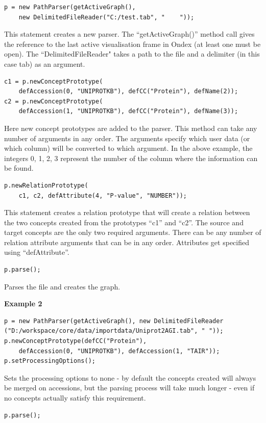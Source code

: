 \begin{verbatim}
p = new PathParser(getActiveGraph(), 
	new DelimitedFileReader("C:/test.tab", "	"));
\end{verbatim}
This statement creates a new parser. The ``getActiveGraph()'' method call gives the reference to the last active visualisation frame in Ondex (at least one must be open). 
The ``DelimitedFileReader" takes a path to the file and a delimiter (in this case tab) as an argument.
\begin{verbatim}
c1 = p.newConceptPrototype(
	defAccession(0, "UNIPROTKB"), defCC("Protein"), defName(2));
c2 = p.newConceptPrototype(
	defAccession(1, "UNIPROTKB"), defCC("Protein"), defName(3));
\end{verbatim}
Here new concept prototypes are added to the parser. This method can take any number of arguments in any order. 
The arguments specify which user data (or which column) will be converted to which argument. 
In the above example, the integers 0, 1, 2, 3 represent the number of the column where the information can be found.
\begin{verbatim}
p.newRelationPrototype(
	c1, c2, defAttribute(4, "P-value", "NUMBER"));
\end{verbatim}
This statement creates a relation prototype that will create a relation between the two concepts created from the prototypes ``c1'' and ``c2''. 
The source and target concepts are the only two required arguments. There can be any number of relation attribute arguments that can be in any order.
Attributes get specified using ``defAttribute''.
\begin{verbatim}
p.parse();
\end{verbatim}
Parses the file and creates the graph.

\vspace{1cm}
\textbf{Example 2}
\begin{verbatim}
p = new PathParser(getActiveGraph(), new DelimitedFileReader
("D:/workspace/core/data/importdata/Uniprot2AGI.tab", "	"));
p.newConceptPrototype(defCC("Protein"), 
	defAccession(0, "UNIPROTKB"), defAccession(1, "TAIR"));
p.setProcessingOptions();
\end{verbatim}
Sets the processing options to none - by default the concepts created will always be merged on accessions, 
but the parsing process will take much longer - even if no concepts actually satisfy this requirement.
\begin{verbatim}
p.parse();
\end{verbatim}

